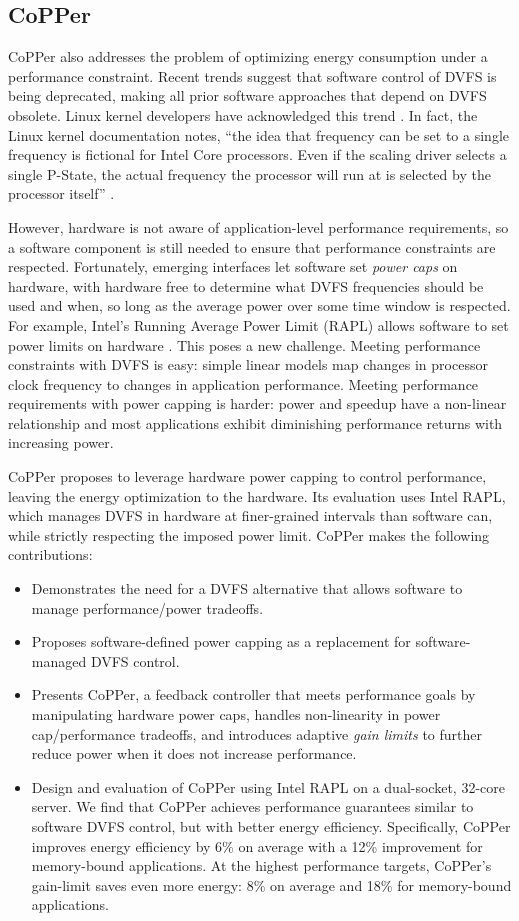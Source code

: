 \subsection{CoPPer}

CoPPer also addresses the problem of optimizing energy consumption under a performance constraint.
Recent trends suggest that software control of DVFS is being deprecated, making all prior software approaches that depend on DVFS obsolete.
Linux kernel developers have acknowledged this trend \cite{lwn602479}.
In fact, the Linux kernel documentation notes, ``the idea that frequency can be set to a single frequency is fictional for Intel Core processors. Even if the scaling driver selects a single P-State, the actual frequency the processor will run at is selected by the processor itself'' \cite{KernelPstate}.

However, hardware is not aware of application-level performance requirements, so a software component is still needed to ensure that performance constraints are respected.
Fortunately, emerging interfaces let software set \emph{power caps} on hardware, with hardware free to determine what DVFS frequencies should be used and when, so long as the average power over some time window is respected.
For example, Intel's Running Average Power Limit (RAPL) allows software to set power limits on hardware \cite{RAPL}.
This poses a new challenge.
Meeting performance constraints with DVFS is easy: simple linear models map changes in processor clock frequency to changes in application performance.
Meeting performance requirements with power capping is harder: power and speedup have a non-linear relationship and most applications exhibit diminishing performance returns with increasing power.

CoPPer proposes to leverage hardware power capping to control performance, leaving the energy optimization to the hardware.
Its evaluation uses Intel RAPL, which manages DVFS in hardware at finer-grained intervals than software can, while strictly respecting the imposed power limit.
CoPPer makes the following contributions:
\begin{itemize}
\item Demonstrates the need for a DVFS alternative that allows software to manage performance/power tradeoffs.
\item Proposes software-defined power capping as a replacement for software-managed DVFS control.
\item Presents CoPPer, a feedback controller that meets performance goals by manipulating hardware power caps, handles non-linearity in power cap/performance tradeoffs, and introduces adaptive \emph{gain limits} to further reduce power when it does not increase performance.
\item Design and evaluation of CoPPer using Intel RAPL on a dual-socket, 32-core server.
We find that CoPPer achieves performance guarantees similar to software DVFS control, but with better energy efficiency.
Specifically, CoPPer improves energy efficiency by 6\% on average with a 12\% improvement for memory-bound applications.
At the highest performance targets, CoPPer's gain-limit saves even more energy: 8\% on average and 18\% for memory-bound applications.
\end{itemize}


